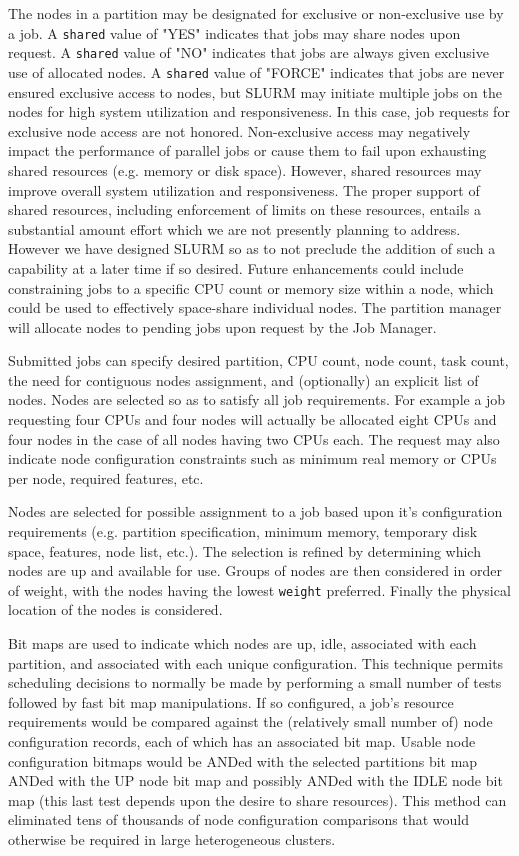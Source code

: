 The nodes in a partition may be designated for exclusive or non-exclusive
use by a job.  A {\tt shared} value of "YES" indicates that jobs may share nodes
upon request.  A {\tt shared} value of "NO" indicates that jobs are always given
exclusive use of allocated nodes.  A {\tt shared} value of "FORCE" indicates
that jobs are never ensured exclusive access to nodes, but SLURM
may initiate multiple jobs on the nodes for high system utilization
and responsiveness.  In this case, job requests for exclusive node
access are not honored.  Non-exclusive access may negatively impact
the performance of parallel jobs or cause them to fail upon exhausting
shared resources (e.g. memory or disk space). However, shared resources
may improve overall system utilization and responsiveness. The
proper support of shared resources, including enforcement of limits on
these resources, entails a substantial amount effort which we are not
presently planning to address.  However we have designed SLURM so as
to not preclude the addition of such a capability at a later time if
so desired.  Future enhancements could include constraining jobs to a
specific CPU count or memory size within a node, which could be used
to effectively space-share individual nodes.  The partition manager will 
allocate nodes to pending jobs upon request by the Job Manager.

Submitted jobs can specify desired partition, CPU count, node count,
task count,  the need for contiguous nodes assignment, and (optionally)
an explicit list of nodes.  Nodes are selected so as to satisfy all
job requirements.  For example a job requesting four CPUs and four nodes
will actually be allocated eight CPUs and four nodes in the case of all
nodes having two CPUs each.  
The request may also indicate node configuration constraints such as
minimum real memory or CPUs per node, required features, etc.

Nodes are selected for possible assignment to a job based upon it's
configuration requirements (e.g. partition specification, minimum memory,
temporary disk space, features, node list, etc.).  The selection is
refined by determining which nodes are up and available for use.
Groups of nodes are then considered in order of weight, with the
nodes having the lowest {\tt weight} preferred.
Finally the physical location of the nodes is considered.

Bit maps are used to indicate which nodes are up, idle, associated
with each partition, and associated with each unique configuration.
This technique permits scheduling decisions to normally be made by
performing a small number of tests followed by fast bit map manipulations. 
If so configured, a job's resource requirements would be compared 
against the (relatively small number of) node configuration records, each of 
which has an associated bit map. Usable node configuration bitmaps 
would be ANDed with the selected partitions bit map ANDed with the 
UP node bit map and possibly ANDed with the IDLE node bit map (this
last test depends upon the desire to share resources). 
This method can eliminated tens of thousands of node configuration 
comparisons that would otherwise be required in large heterogeneous 
clusters.

